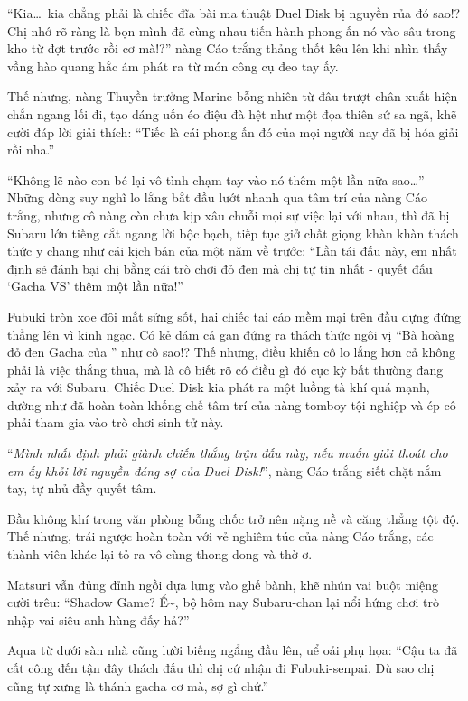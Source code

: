 \documentclass[../main.tex]{subfiles}
\begin{document}
``Kia\dots\ kia chẳng phải là chiếc đĩa bài ma thuật Duel Disk bị nguyền rủa đó sao!? Chị nhớ rõ ràng là bọn mình đã cùng nhau tiến hành phong ấn nó vào sâu trong kho từ đợt trước rồi cơ mà!?'' nàng Cáo trắng thảng thốt kêu lên khi nhìn thấy vầng hào quang hắc ám phát ra từ món công cụ đeo tay ấy.

Thế nhưng, nàng Thuyền trưởng Marine bỗng nhiên từ đâu trượt chân xuất hiện chắn ngang lối đi, tạo dáng uốn éo điệu đà hệt như một đọa thiên sứ sa ngã, khẽ cười đáp lời giải thích: ``Tiếc là cái phong ấn đó của mọi người nay đã bị hóa giải rồi nha.''


``Không lẽ nào con bé lại vô tình chạm tay vào nó thêm một lần nữa sao\dots'' Những dòng suy nghĩ lo lắng bắt đầu lướt nhanh qua tâm trí của nàng Cáo trắng, nhưng cô nàng còn chưa kịp xâu chuỗi mọi sự việc lại với nhau, thì đã bị Subaru lớn tiếng cắt ngang lời bộc bạch, tiếp tục giở chất giọng khàn khàn thách thức y chang như cái kịch bản của một năm về trước: ``Lần tái đấu này, em nhất định sẽ đánh bại chị bằng cái trò chơi đỏ đen mà chị tự tin nhất - quyết đấu `Gacha VS' thêm một lần nữa!''

Fubuki tròn xoe đôi mắt sửng sốt, hai chiếc tai cáo mềm mại trên đầu dựng đứng thẳng lên vì kinh ngạc. Có kẻ dám cả gan đứng ra thách thức ngôi vị ``Bà hoàng đỏ đen Gacha của \hll'' như cô sao!? Thế nhưng, điều khiến cô lo lắng hơn cả không phải là việc thắng thua, mà là cô biết rõ có điều gì đó cực kỳ bất thường đang xảy ra với Subaru. Chiếc Duel Disk kia phát ra một luồng tà khí quá mạnh, dường như đã hoàn toàn khống chế tâm trí của nàng tomboy tội nghiệp và ép cô phải tham gia vào trò chơi sinh tử này.

``\textit{Mình nhất định phải giành chiến thắng trận đấu này, nếu muốn giải thoát cho em ấy khỏi lời nguyền đáng sợ của Duel Disk!}'', nàng Cáo trắng siết chặt nắm tay, tự nhủ đầy quyết tâm.

Bầu không khí trong văn phòng bỗng chốc trở nên nặng nề và căng thẳng tột độ. Thế nhưng, trái ngược hoàn toàn với vẻ nghiêm túc của nàng Cáo trắng, các thành viên khác lại tỏ ra vô cùng thong dong và thờ ơ.

Matsuri vẫn đủng đỉnh ngồi dựa lưng vào ghế bành, khẽ nhún vai buột miệng cười trêu: ``Shadow Game? Ể\~{}, bộ hôm nay Subaru-chan lại nổi hứng chơi trò nhập vai siêu anh hùng đấy hả?''

Aqua từ dưới sàn nhà cũng lười biếng ngẩng đầu lên, uể oải phụ họa: ``Cậu ta đã cất công đến tận đây thách đấu thì chị cứ nhận đi Fubuki-senpai. Dù sao chị cũng tự xưng là thánh gacha cơ mà, sợ gì chứ.''
\end{document}
